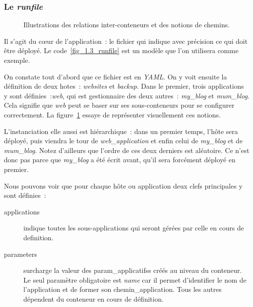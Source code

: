 \subsubsection{Le \emph{runfile}}

\begin{figure}
	\centerfloat
	\caption{Illustrations des relations inter-conteneurs et des notions de chemins.}
	\label{relation_conteneurs}
	
\end{figure}



Il s'agit du cœur de l'application~: le fichier qui indique avec précision ce qui doit être déployé.
Le code~\ref{fig_1.3_runfile} est un modèle que l'on utilisera comme exemple.

On constate tout d'abord que ce fichier est en \emph{YAML}. 
On y voit ensuite la définition de deux \glspl{hote}~: \emph{websites} et \emph{backup}.
Dans le premier, trois \glspl{application} y sont définies~:\emph{web}, qui est \gls{gestionnaire} des deux autres~: \emph{my\_blog} et \emph{mum\_blog}.
Cela signifie que \emph{web} peut se baser sur ses \glspl{sous-conteneur} pour se configurer correctement.
La figure~\ref{relation_conteneurs} essaye de représenter visuellement ces notions.

L'\gls{instanciation} elle aussi est hiérarchique~: dans un premier temps, l'hôte sera déployé, puis viendra le tour de \emph{web\_application} et enfin celui de \emph{my\_blog} et de \emph{mum\_blog}.
Notez d'ailleurs que l'ordre de ces deux derniers est aléatoire.
Ce n'est donc pas parce que \emph{my\_blog} a été écrit avant, qu'il sera forcément déployé en premier.

Nous pouvons voir que pour chaque hôte ou application deux clefs principales y sont définies~:
\begin{description}
	\item[applications] indique toutes les \glspl{sous-application} qui seront gérées par celle en cours de \gls{definition}.
	\item[parameters] surcharge la valeur des \glspl{param_applicatifs} créés au niveau du conteneur.
		Le seul paramètre obligatoire est \emph{name} car il permet d'identifier le nom de l'application et de former son \gls{chemin_application}.
		Tous les autres dépendent du conteneur en cours de définition.
\end{description}

